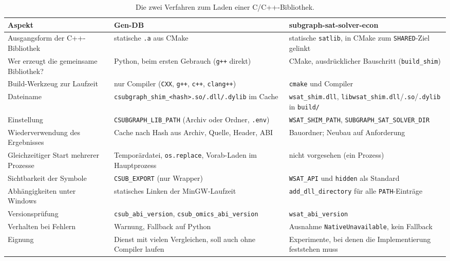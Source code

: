 \begin{table}[!ht]
	\centering
	\small
	\begin{tabularx}{\textwidth}{@{}L{3.2cm}YY@{}}
		\toprule
		Aspekt & Gen-DB & subgraph-sat-solver-econ \\
		\midrule
		Ausgangsform der C++-Bibliothek & statische \texttt{.a} aus CMake & statische \texttt{satlib}, in CMake zum \texttt{SHARED}-Ziel gelinkt \\[0.3em]
		Wer erzeugt die gemeinsame Bibliothek? & Python, beim ersten Gebrauch (\texttt{g++} direkt) & CMake, ausdrücklicher Bauschritt (\texttt{build\_shim}) \\[0.3em]
		Build-Werkzeug zur Laufzeit & nur Compiler (\texttt{CXX}, \texttt{g++}, \texttt{c++}, \texttt{clang++}) & \texttt{cmake} und Compiler \\[0.3em]
		Dateiname & \texttt{csubgraph\_shim\_<hash>.so/.dll/.dylib} im Cache & \texttt{wsat\_shim.dll}, \texttt{libwsat\_shim.dll}/\texttt{.so}/\texttt{.dylib} in \texttt{build/} \\[0.3em]
		Einstellung & \texttt{CSUBGRAPH\_LIB\_PATH} (Archiv oder Ordner, \texttt{.env}) & \texttt{WSAT\_SHIM\_PATH}, \texttt{SUBGRAPH\_SAT\_SOLVER\_DIR} \\[0.3em]
		Wiederverwendung des Ergebnisses & Cache nach Hash aus Archiv, Quelle, Header, ABI & Bauordner; Neubau auf Anforderung \\[0.3em]
		Gleichzeitiger Start mehrerer Prozesse & Temporärdatei, \texttt{os.replace}, Vorab-Laden im Hauptprozess & nicht vorgesehen (ein Prozess) \\[0.3em]
		Sichtbarkeit der Symbole & \texttt{CSUB\_EXPORT} (nur Wrapper) & \texttt{WSAT\_API} und \texttt{hidden} als Standard \\[0.3em]
		Abhängigkeiten unter Windows & statisches Linken der MinGW-Laufzeit & \texttt{add\_dll\_directory} für alle \texttt{PATH}-Einträge \\[0.3em]
		Versionsprüfung & \texttt{csub\_abi\_version}, \texttt{csub\_omics\_abi\_version} & \texttt{wsat\_abi\_version} \\[0.3em]
		Verhalten bei Fehlern & Warnung, Fallback auf Python & Ausnahme \texttt{NativeUnavailable}, kein Fallback \\[0.3em]
		Eignung & Dienst mit vielen Vergleichen, soll auch ohne Compiler laufen & Experimente, bei denen die Implementierung feststehen muss \\
		\bottomrule
	\end{tabularx}
	\caption{Die zwei Verfahren zum Laden einer C/C++-Bibliothek.}
	\label{tab:laden_vergleich}
\end{table}

